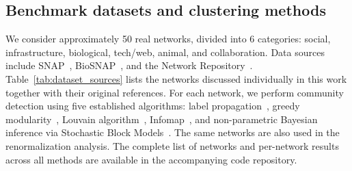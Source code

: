 \documentclass[twocolumn,superscriptaddress,tightenlines,aps,prx,floatfix]{revtex4-2}
\begin{document}
\begin{bibunit}
\subsection{Benchmark datasets and clustering methods}
We consider approximately 50 real networks, divided into 6 categories: social, infrastructure, biological, tech/web, animal, and collaboration.
Data sources include SNAP~\cite{snapnets}, BioSNAP~\cite{biosnapnets}, and the Network Repository~\cite{Network_Repository}.
Table~\ref{tab:dataset_sources} lists the networks discussed individually in this work together with their original references.
For each network, we perform community detection using five established algorithms: label propagation~\cite{Lab_prob,Lab_prop_networks}, greedy modularity~\cite{Modularity_Newman_2006}, Louvain algorithm~\cite{Louvain_algo}, Infomap~\cite{mapequation2025software,Map_equation_networks}, and non-parametric Bayesian inference via Stochastic Block Models~\cite{Peixoto_Bayesian_SBM_2019}.
The same networks are also used in the renormalization analysis. The complete list of networks and per-network results across all methods are available in the accompanying code repository.
 

\end{bibunit}
\end{document}
